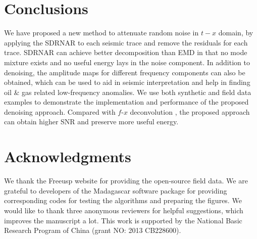 \section{Conclusions}
We have proposed a new method to attenuate random noise in $t-x$ domain, by applying the SDRNAR to each seismic trace and remove the residuals for each trace. 
SDRNAR can achieve better decomposition than EMD in that no mode mixture exists and no useful energy lays in the noise component. In addition to denoising, the amplitude maps 
for different frequency components can also be obtained, which can be used to aid in seismic interpretation and help in finding oil \& gas related low-frequency anomalies. We use both synthetic and field data examples to demonstrate the implementation and performance of the proposed denoising approach.   Compared with $f$-$x$ 
deconvolution , the proposed approach can obtain higher SNR and preserve more useful energy.

\section{Acknowledgments}
We thank the Freeusp website for providing the open-source field data. We are grateful to developers of the Madagascar software package for providing corresponding codes for testing the algorithms and preparing the figures. We would like to thank three anonymous reviewers for helpful suggestions, which improves the manuscript a lot. This work is supported by the National Basic Research Program of China (grant NO: 2013 CB228600).








\newpage
\listoffigures





